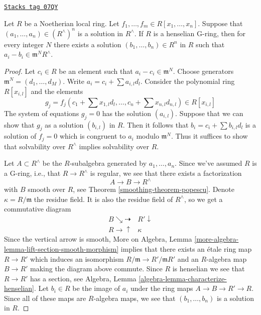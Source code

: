 \begin{theorem}
\label{smoothing-theorem-approximation-property}
\href{https://stacks.math.columbia.edu/tag/07QY}{\texttt{Stacks tag 07QY}}

Let $R$ be a Noetherian local ring. Let
$f_1, \ldots, f_m \in R[x_1, \ldots, x_n]$.
Suppose that $(a_1, \ldots, a_n) \in (R^\wedge)^n$ is a solution
in $R^\wedge$. If $R$ is a henselian G-ring, then for every integer
$N$ there exists a solution $(b_1, \ldots, b_n) \in R^n$ in $R$ such that
$a_i - b_i \in \mathfrak m^NR^\wedge$.
\end{theorem}

\begin{proof}

Let $c_i \in R$ be an element such that $a_i - c_i \in \mathfrak m^N$.
Choose generators $\mathfrak m^N = (d_1, \ldots, d_M)$.
Write $a_i = c_i + \sum a_{i, l} d_l$.
Consider the polynomial ring $R[x_{i, l}]$ and the elements
$$
g_j = f_j(c_1 + \sum x_{1, l} d_l , \ldots, c_n + \sum x_{n, l} d_{n, l})
\in R[x_{i, l}]
$$
The system of equations $g_j = 0$ has the solution $(a_{i, l})$.
Suppose that we can show that $g_j$ as a solution $(b_{i, l})$ in $R$.
Then it follows that $b_i = c_i + \sum b_{i, l}d_l$ is a solution
of $f_j = 0$ which is congruent to $a_i$ modulo $\mathfrak m^N$.
Thus it suffices to show that solvability over $R^\wedge$ implies
solvability over $R$.

\medskip\noindent
Let $A \subset R^\wedge$ be the $R$-subalgebra generated by
$a_1, \ldots, a_n$. Since we've assumed $R$ is a G-ring, i.e.,
that $R \to R^\wedge$ is regular, we see that
there exists a factorization
$$
A \to B \to R^\wedge
$$
with $B$ smooth over $R$, see Theorem \ref{smoothing-theorem-popescu}.
Denote $\kappa = R/\mathfrak m$ the residue field. It is also
the residue field of $R^\wedge$, so we get a commutative diagram
$$
\begin{array}{cc}B \searrow\dashrightarrow & R' \downarrow \\ R \longrightarrow\uparrow & \kappa\end{array}
$$
Since the vertical arrow is smooth,
More on Algebra, Lemma \ref{more-algebra-lemma-lift-section-smooth-morphism}
implies that there exists an \'etale ring map $R \to R'$
which induces an isomorphism $R/\mathfrak m \to R'/\mathfrak mR'$
and an $R$-algebra map $B \to R'$ making the diagram above commute.
Since $R$ is henselian we see that $R \to R'$ has a section, see
Algebra, Lemma \ref{algebra-lemma-characterize-henselian}.
Let $b_i \in R$ be the image of $a_i$ under the ring maps
$A \to B \to R' \to R$. Since all of these maps are $R$-algebra
maps, we see that $(b_1, \ldots, b_n)$ is a solution in $R$.
\end{proof}

